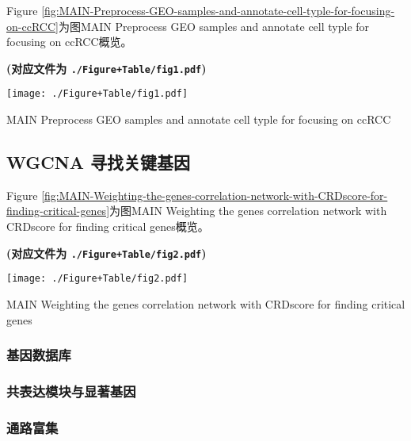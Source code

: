 \documentclass[
]{article}
\begin{document}
Figure \ref{fig:MAIN-Preprocess-GEO-samples-and-annotate-cell-typle-for-focusing-on-ccRCC}为图MAIN Preprocess GEO samples and annotate cell typle for focusing on ccRCC概览。

\textbf{(对应文件为 \texttt{./Figure+Table/fig1.pdf})}

\def\@captype{figure}
\begin{center}
\texttt{[image: ./Figure+Table/fig1.pdf]}
\caption{MAIN Preprocess GEO samples and annotate cell typle for focusing on ccRCC}\label{fig:MAIN-Preprocess-GEO-samples-and-annotate-cell-typle-for-focusing-on-ccRCC}
\end{center}

\hypertarget{wgcna-ux5bfbux627eux5173ux952eux57faux56e0}{%
\subsection{WGCNA 寻找关键基因}\label{wgcna-ux5bfbux627eux5173ux952eux57faux56e0}}

Figure \ref{fig:MAIN-Weighting-the-genes-correlation-network-with-CRDscore-for-finding-critical-genes}为图MAIN Weighting the genes correlation network with CRDscore for finding critical genes概览。

\textbf{(对应文件为 \texttt{./Figure+Table/fig2.pdf})}

\def\@captype{figure}
\begin{center}
\texttt{[image: ./Figure+Table/fig2.pdf]}
\caption{MAIN Weighting the genes correlation network with CRDscore for finding critical genes}\label{fig:MAIN-Weighting-the-genes-correlation-network-with-CRDscore-for-finding-critical-genes}
\end{center}

\hypertarget{ux57faux56e0ux6570ux636eux5e93}{%
\subsubsection{基因数据库}\label{ux57faux56e0ux6570ux636eux5e93}}

\hypertarget{ux5171ux8868ux8fbeux6a21ux5757ux4e0eux663eux8457ux57faux56e0}{%
\subsubsection{共表达模块与显著基因}\label{ux5171ux8868ux8fbeux6a21ux5757ux4e0eux663eux8457ux57faux56e0}}

\hypertarget{ux901aux8defux5bccux96c6}{%
\subsubsection{通路富集}\label{ux901aux8defux5bccux96c6}}
\end{document}

